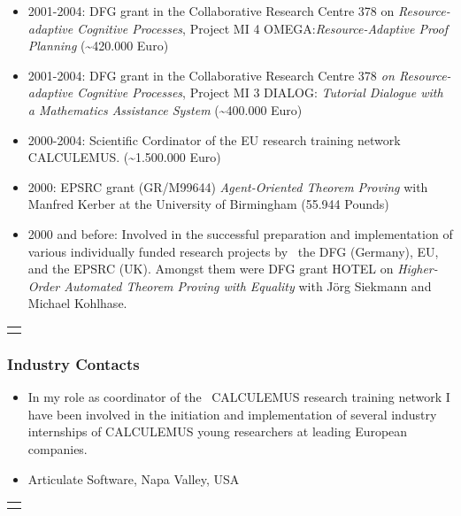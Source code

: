 \documentclass{letter}
\newcommand{\tmem}[1]{{\em #1\/}}
\newcommand{\tmtextit}[1]{{\itshape{#1}}}
\begin{document}
\begin{itemize}
  \item {\small 2001-2004: DFG grant in the Collaborative Research Centre 378
  on \tmtextit{Resource-adaptive Cognitive Processes}, Project MI 4
  OMEGA:}\tmtextit{{\small  Resource-Adaptive Proof Planning}} (\~{ }420.000
  Euro)
  
  \item {\small 2001-2004: DFG grant in the Collaborative Research Centre
  378\tmtextit{ on Resource-adaptive Cognitive Processes}, Project MI 3
  DIALOG: \tmtextit{Tutorial Dialogue with a Mathematics Assistance System}}
  (\~{ }400.000 Euro)
  
  \item 2000-2004: Scientific Cordinator of the EU research training network
  CALCULEMUS. (\~{ }1.500.000 Euro)
  
  \item 2000: EPSRC grant (GR/M99644) {\tmem{Agent-Oriented Theorem Proving}}
  with Manfred Kerber at the University of Birmingham (55.944 Pounds)
  
  \item {\small 2000 and before: Involved in the successful preparation and
  implementation of various individually funded research projects by \ the DFG
  (Germany), EU, and the EPSRC (UK).} Amongst them were DFG grant HOTEL on
  {\tmem{Higher-Order Automated Theorem Proving with Equality}} with J\"org
  Siekmann and Michael Kohlhase. 
\end{itemize}
{\noindent}\begin{tabular}{l}
  \hline
  \quad
\end{tabular}

\subsubsection*{Industry Contacts}

\begin{itemize}
  \item {\small In my role as coordinator of the \ CALCULEMUS research
  training network I have been involved in the initiation and implementation
  of several industry internships of CALCULEMUS young researchers at leading
  European companies.}
  
  \item Articulate Software, Napa Valley, USA
\end{itemize}
{\noindent}\begin{tabular}{l}
  \hline
  \quad
\end{tabular}
\end{document}
